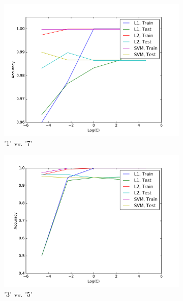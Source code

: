 \documentclass[10pt,psamsfonts]{amsart}
\theoremstyle{definition}
\theoremstyle{remark}
\numberwithin{equation}{section}
\begin{document}
\begin{figure}
	\centering
	\begin{subfigure}[b]{0.23\textwidth}
		\includegraphics[width=\textwidth]{hw2_4-1_1v7_norm.pdf}
		\caption{'1' vs. '7'}
	\end{subfigure}
	\begin{subfigure}[b]{0.23\textwidth}
		\includegraphics[width=\textwidth]{hw2_4-1_3v5_norm.pdf}
		\caption{'3' vs. '5'}
	\end{subfigure}
	\begin{subfigure}[b]{0.23\textwidth}

\end{subfigure}
\end{figure}
\end{document}
